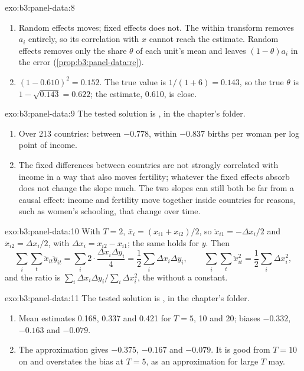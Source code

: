 \begin{solution}{exo:b3:panel-data:8}
\begin{enumerate}
\item Random effects moves; fixed effects does not. The within transform
removes $a_i$ entirely, so its correlation with $x$ cannot reach the estimate.
Random effects removes only the share $\theta$ of each unit's mean and leaves
$(1 - \theta)a_i$ in the error (\cref{prop:b3:panel-data:re}).
\item $(1 - 0.610)^2 = 0.152$. The true value is $1/(1 + 6) = 0.143$, so the
true $\theta$ is $1 - \sqrt{0.143} = 0.622$; the estimate, 0.610, is close.
\end{enumerate}
\end{solution}

\begin{solution}{exo:b3:panel-data:9}
The tested solution is , in the chapter's
 folder.
\begin{enumerate}
\item Over 213 countries: between $-0.778$, within $-0.837$ births per woman per
log point of income. %
\item The fixed differences between countries are not strongly correlated with
income in a way that also moves fertility; whatever the fixed effects absorb
does not change the slope much. The two slopes can still both be far from a
causal effect: income and fertility move together inside countries for reasons,
such as women's schooling, that change over time.
\end{enumerate}
\end{solution}

\begin{solution}{exo:b3:panel-data:10}
With $T = 2$, $\bar x_i = (x_{i1} + x_{i2})/2$, so $\ddot x_{i1} = -\Delta x_i/2$
and $\ddot x_{i2} = \Delta x_i/2$, with $\Delta x_i = x_{i2} - x_{i1}$; the same
holds for $y$. Then
\[
  \sum_i\sum_t \ddot x_{it}\ddot y_{it} = \sum_i 2 \cdot \frac{\Delta x_i \Delta y_i}{4} = \frac12 \sum_i \Delta x_i\Delta y_i,
  \qquad
  \sum_i\sum_t \ddot x_{it}^2 = \frac12 \sum_i \Delta x_i^2,
\]
and the ratio is $\sum_i \Delta x_i \Delta y_i / \sum_i \Delta x_i^2$, the
 without a constant.
\end{solution}

\begin{solution}{exo:b3:panel-data:11}
The tested solution is , in the chapter's
 folder.
\begin{enumerate}
\item Mean estimates 0.168, 0.337 and 0.421 for $T = 5$, 10 and 20; biases
$-0.332$, $-0.163$ and $-0.079$. %
\item The approximation gives $-0.375$, $-0.167$ and $-0.079$. It is good from
$T = 10$ on and overstates the bias at $T = 5$, as an approximation for large
$T$ may.
\end{enumerate}
\end{solution}

